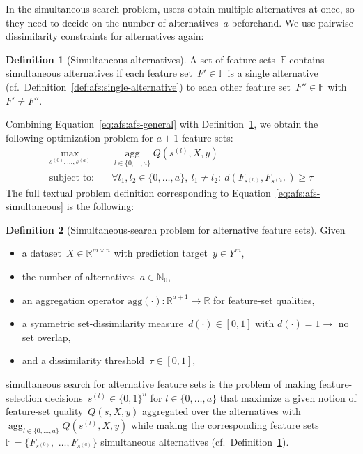 \documentclass{article}
\theoremstyle{definition}
\newtheorem{definition}{Definition}
\begin{document}
In the simultaneous-search problem, users obtain multiple alternatives at once, so they need to decide on the number of alternatives~$a$ beforehand.
We use pairwise dissimilarity constraints for alternatives again:
%
\begin{definition}[Simultaneous alternatives]
	A set of feature sets~$\mathbb{F}$ contains simultaneous alternatives if each feature set~$F' \in \mathbb{F}$ is a single alternative (cf.~Definition~\ref{def:afs:single-alternative}) to each other feature set~$F'' \in \mathbb{F}$ with $F' \neq F''$.
	\label{def:afs:simultaneous-alternative}
\end{definition}
%
Combining Equation~\ref{eq:afs:afs-general} with Definition~\ref{def:afs:simultaneous-alternative}, we obtain the following optimization problem for $a+1$ feature sets:
%
\begin{equation}
	\begin{aligned}
		\max_{s^{(0)}, \dots, s^{(a)}} &\quad \operatorname*{agg}_{l \in \{0, \dots, a\}} Q(s^{(l)},X,y) \\
		\text{subject to:} &\quad \forall l_1, l_2 \in \{0, \dots, a\},~l_1 \neq l_2:~d(F_{s^{(l_1)}},F_{s^{(l_2)}}) \geq \tau
	\end{aligned}
	\label{eq:afs:afs-simultaneous}
\end{equation}
%
The full textual problem definition corresponding to Equation~\ref{eq:afs:afs-simultaneous} is the following:
%
\begin{definition}[Simultaneous-search problem for alternative feature sets]
	Given
	\begin{itemize}[noitemsep]
		\item a dataset~$X \in \mathbb{R}^{m \times n}$ with prediction target~$y \in Y^m$,
		\item the number of alternatives~$a \in \mathbb{N}_0$,
		\item an aggregation operator $\text{agg}(\cdot): \mathbb{R}^{a+1} \to \mathbb{R}$ for feature-set qualities,
		\item a symmetric set-dissimilarity measure~$d(\cdot) \in [0,1]$ with $d(\cdot) = 1 \rightarrow$ no set overlap,
		\item and a dissimilarity threshold~$\tau \in [0,1]$,
	\end{itemize}
	simultaneous search for alternative feature sets is the problem of making feature-selection decisions~$s^{(l)} \in \{0,1\}^n$ for $l \in \{0, \dots, a\}$ that maximize a given notion of feature-set quality~$Q(s,X,y)$ aggregated over the alternatives with $\operatorname*{agg}_{l \in \{0, \dots, a\}} Q(s^{(l)},X,y)$ while making the corresponding feature sets $\mathbb{F} = \{F_{s^{(0)}},$ $\dots, F_{s^{(a)}}\}$ simultaneous alternatives (cf.~Definition~\ref{def:afs:simultaneous-alternative}).
	\label{def:afs:alternative-feature-selection-simultaneous}
\end{definition}
\end{document}
